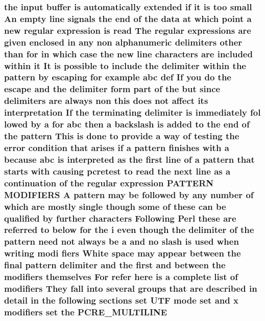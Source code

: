 \subsubsection[{\texorpdfstring{P\+C\+R\+E\+\_\+\+M\+U\+L\+T\+I\+L\+I\+NE}{PCRE_MULTILINE}}]{\setlength{\rightskip}{0pt plus 5cm}the {\bf input} {\bf buffer} {\bf is} automatically extended {\bf if} {\bf it} {\bf is} too small An {\bf empty} {\bf line} signals the {\bf end} {\bf of} the {\bf data} at {\bf which} {\bf point} {\bf a} new regular {\bf expression} {\bf is} {\bf read} The regular {\bf expressions} {\bf are} {\bf given} enclosed {\bf in} {\bf any} non {\bf alphanumeric} delimiters other {\bf than} for {\bf in} {\bf which} {\bf case} the new {\bf line} {\bf characters} {\bf are} {\bf included} within {\bf it} It {\bf is} {\bf possible} {\bf to} {\bf include} the delimiter within the {\bf pattern} by escaping for {\bf example} {\bf abc} def If you {\bf do} the escape and the delimiter form part {\bf of} the but since delimiters {\bf are} always non {\bf this} does {\bf not} affect its interpretation If the terminating delimiter {\bf is} immediately fol lowed by {\bf a} for {\bf abc} then {\bf a} {\bf backslash} {\bf is} added {\bf to} the {\bf end} {\bf of} the {\bf pattern} This {\bf is} {\bf done} {\bf to} provide {\bf a} {\bf way} {\bf of} testing the {\bf error} condition that {\bf arises} {\bf if} {\bf a} {\bf pattern} finishes {\bf with} {\bf a} because {\bf abc} {\bf is} interpreted {\bf as} the {\bf first} {\bf line} {\bf of} {\bf a} {\bf pattern} that starts {\bf with} causing {\bf pcretest} {\bf to} {\bf read} the next {\bf line} {\bf as} {\bf a} continuation {\bf of} the regular {\bf expression} P\+A\+T\+T\+E\+RN M\+O\+D\+I\+F\+I\+E\+RS {\bf A} {\bf pattern} may {\bf be} followed by {\bf any} {\bf number} {\bf of} {\bf which} {\bf are} mostly single {\bf though} some {\bf of} these {\bf can} {\bf be} qualified by further {\bf characters} Following {\bf Perl} these {\bf are} referred {\bf to} {\bf below} for the {\bf i} even {\bf though} the delimiter {\bf of} the {\bf pattern} need {\bf not} always {\bf be} {\bf a} and no {\bf slash} {\bf is} {\bf used} when writing modi fiers White {\bf space} may appear between the final {\bf pattern} delimiter and the {\bf first} and between the {\bf modifiers} {\bf themselves} For refer {\bf here} {\bf is} {\bf a} complete {\bf list} {\bf of} {\bf modifiers} They fall into several groups that {\bf are} described {\bf in} detail {\bf in} the following sections {\bf set} U\+TF {\bf mode} {\bf set} and {\bf x} {\bf modifiers} {\bf set} the P\+C\+R\+E\+\_\+\+M\+U\+L\+T\+I\+L\+I\+NE}\hypertarget{pcretest_8txt_a1d819abc0ef0512f286b7ce5cb2ab208}{}\label{pcretest_8txt_a1d819abc0ef0512f286b7ce5cb2ab208}
